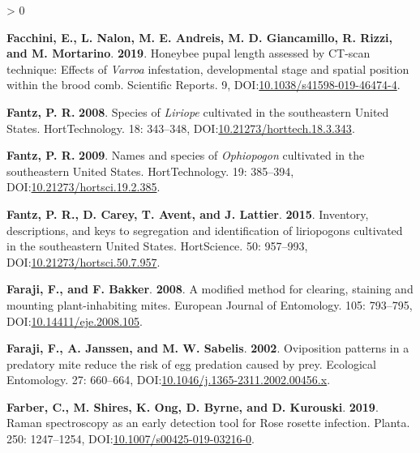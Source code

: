 \documentclass{ufdissertation}[overrideChapters] %
\newlength{\cslhangindent}
\newenvironment{CSLReferences}[2] %
 {%
  \setlength{\parindent}{0pt}
  \ifodd #1 \everypar{\setlength{\hangindent}{\cslhangindent}}\ignorespaces\fi
  \ifnum #2 > 0
  \setlength{\parskip}{#2\baselineskip}
  \fi
 }%
 {}
\begin{document}
{\begin{CSLReferences}{1}{1}
\leavevmode{}%
\textbf{Facchini, E., L. Nalon, M. E. Andreis, M. D. Giancamillo, R. Rizzi, and M. Mortarino}. \textbf{2019}. Honeybee pupal length assessed by {CT}-scan technique: Effects of {\emph{Varroa}} infestation, developmental stage and spatial position within the brood comb. Scientific Reports. 9, DOI:\href{https://doi.org/10.1038/s41598-019-46474-4}{10.1038/s41598-019-46474-4}.

\leavevmode{}%
\textbf{Fantz, P. R.} \textbf{2008}. Species of {\emph{Liriope}} cultivated in the southeastern {United States}. {HortTechnology}. 18: 343--348, DOI:\href{https://doi.org/10.21273/horttech.18.3.343}{10.21273/horttech.18.3.343}.

\leavevmode{}%
\textbf{Fantz, P. R.} \textbf{2009}. Names and species of {\emph{Ophiopogon}} cultivated in the southeastern {United States}. {HortTechnology}. 19: 385--394, DOI:\href{https://doi.org/10.21273/hortsci.19.2.385}{10.21273/hortsci.19.2.385}.

\leavevmode{}%
\textbf{Fantz, P. R., D. Carey, T. Avent, and J. Lattier}. \textbf{2015}. Inventory, descriptions, and keys to segregation and identification of liriopogons cultivated in the southeastern {United States}. {HortScience}. 50: 957--993, DOI:\href{https://doi.org/10.21273/hortsci.50.7.957}{10.21273/hortsci.50.7.957}.

\leavevmode{}%
\textbf{Faraji, F., and F. Bakker}. \textbf{2008}. A modified method for clearing, staining and mounting plant-inhabiting mites. European Journal of Entomology. 105: 793--795, DOI:\href{https://doi.org/10.14411/eje.2008.105}{10.14411/eje.2008.105}.

\leavevmode{}%
\textbf{Faraji, F., A. Janssen, and M. W. Sabelis}. \textbf{2002}. Oviposition patterns in a predatory mite reduce the risk of egg predation caused by prey. Ecological Entomology. 27: 660--664, DOI:\href{https://doi.org/10.1046/j.1365-2311.2002.00456.x}{10.1046/j.1365-2311.2002.00456.x}.

\leavevmode{}%
\textbf{Farber, C., M. Shires, K. Ong, D. Byrne, and D. Kurouski}. \textbf{2019}. {Raman} spectroscopy as an early detection tool for {Rose rosette} infection. Planta. 250: 1247--1254, DOI:\href{https://doi.org/10.1007/s00425-019-03216-0}{10.1007/s00425-019-03216-0}.


\end{CSLReferences}}
\end{document}
